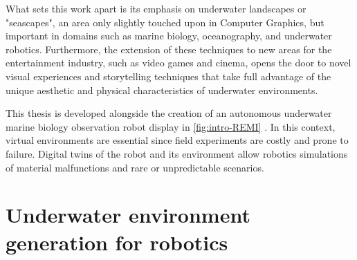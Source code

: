 What sets this work apart is its emphasis on underwater landscapes or "seascapes", an area only slightly touched upon in Computer Graphics, but important in domains such as marine biology, oceanography, and underwater robotics. Furthermore, the extension of these techniques to new areas for the entertainment industry, such as video games and cinema, opens the door to novel visual experiences and storytelling techniques that take full advantage of the unique aesthetic and physical characteristics of underwater environments.

This thesis is developed alongside the creation of an autonomous underwater marine biology observation robot display in \cref{fig:intro-REMI} \cite{Maslin2021}. In this context, virtual environments are essential since field experiments are costly and prone to failure. Digital twins of the robot and its environment allow robotics simulations of material malfunctions and rare or unpredictable scenarios.

\section{Underwater environment generation for robotics}


